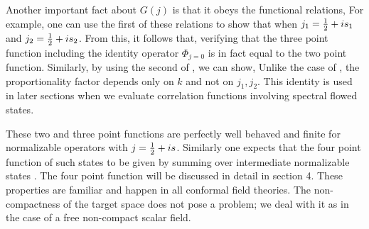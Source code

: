 Another important fact about $G(j)$ is that it
obeys the functional relations,
\eqn{}
For example, one can use the first of these relations to show that
\eqn{}
when $j_1={1\over 2} + is_1$ and
$j_2={1\over 2} + is_2$. From this, it follows that,
\eqn{}
verifying that the three point function including the
identity operator $\Phi_{j=0}$ is in fact equal to the two point
function. Similarly, by using the second of \grelation ,
we can show,
\eqn{}
Unlike the case of \twoandthree , the
proportionality factor depends only on $k$
and not on $j_1, j_2$. This identity is used in later sections
when we evaluate correlation functions involving spectral flowed
states.




These two and three point functions are perfectly well behaved and finite
for normalizable operators with $j= {1 \over 2} + is $.
Similarly one  expects that
the four point function of such states to be given by summing over
intermediate normalizable states .
 The four point
function will be discussed in detail in section 4.
These properties are familiar and happen in all conformal field theories.
The non-compactness of the  target space does not pose a problem;
we  deal with it as in the case of a free non-compact scalar field.



